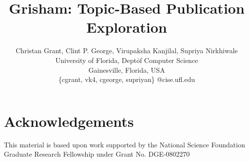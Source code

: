 \documentclass{sig-alternate}
\newcommand{\system}{Grisham\xspace}
\begin{document}
\title{\system: Topic-Based Publication Exploration}

\author{Christan Grant, Clint P. George, Virupaksha Kanjilal, Supriya Nirkhiwale \\
				University of Florida, Dept\. of Computer Science \\
				Gainesville, Florida, USA \\
				\{cgrant, vk4, cgeorge, supriyan\} @cise.ufl.edu
}

\maketitle











\section{Acknowledgements}
This material is based upon work supported by the National Science Foundation 
Graduate Research Fellowship under Grant No. DGE-0802270



\begin{small}

\end{small}
\end{document}
